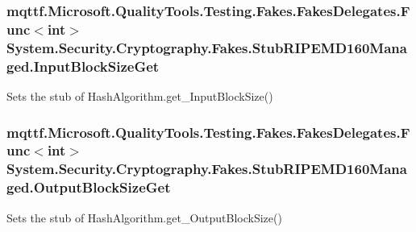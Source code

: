 \hypertarget{class_system_1_1_security_1_1_cryptography_1_1_fakes_1_1_stub_r_i_p_e_m_d160_managed_a8520652aa4d9f9c4bd852be9086dcb92}{
\subsubsection[{Input\-Block\-Size\-Get}]{\setlength{\rightskip}{0pt plus 5cm}mqttf.\-Microsoft.\-Quality\-Tools.\-Testing.\-Fakes.\-Fakes\-Delegates.\-Func$<$int$>$ System.\-Security.\-Cryptography.\-Fakes.\-Stub\-R\-I\-P\-E\-M\-D160\-Managed.\-Input\-Block\-Size\-Get}}\label{class_system_1_1_security_1_1_cryptography_1_1_fakes_1_1_stub_r_i_p_e_m_d160_managed_a8520652aa4d9f9c4bd852be9086dcb92}


Sets the stub of Hash\-Algorithm.\-get\-\_\-\-Input\-Block\-Size()

\hypertarget{class_system_1_1_security_1_1_cryptography_1_1_fakes_1_1_stub_r_i_p_e_m_d160_managed_a9f4213603e0d32386adf327a4d079f29}{
\subsubsection[{Output\-Block\-Size\-Get}]{\setlength{\rightskip}{0pt plus 5cm}mqttf.\-Microsoft.\-Quality\-Tools.\-Testing.\-Fakes.\-Fakes\-Delegates.\-Func$<$int$>$ System.\-Security.\-Cryptography.\-Fakes.\-Stub\-R\-I\-P\-E\-M\-D160\-Managed.\-Output\-Block\-Size\-Get}}\label{class_system_1_1_security_1_1_cryptography_1_1_fakes_1_1_stub_r_i_p_e_m_d160_managed_a9f4213603e0d32386adf327a4d079f29}


Sets the stub of Hash\-Algorithm.\-get\-\_\-\-Output\-Block\-Size()



